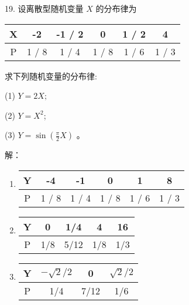 \documentclass[14pt]{scrartcl} %
\numberwithin{equation}{section} %
\numberwithin{figure}{section} %
\numberwithin{table}{section} %
\begin{document}
	19. 设离散型随机变量 $X$ 的分布律为
	
	\begin{tabular}{c|ccccc}
		X & -2 & -1 / 2 & 0 & 1 / 2 & 4\\
		\hline
		P & 1 / 8 & 1 / 4 & 1 / 8 & 1 / 6 & 1 / 3 \\
	\end{tabular}
	求下列随机变量的分布律: 
	
	(1) $Y=2 X ;$
	
	(2) $Y=X^{2}$; 
	
	(3) $Y=\sin \left(\frac{\pi}{2} X\right)$ 。
	
	\vspace*{1cm}
	解：
	\begin{enumerate}[(1)]
		\item 
		\begin{tabular}{c|ccccc}
			Y & -4 & -1& 0 & 1 & 8\\
			\hline
			P & 1 / 8 & 1 / 4 & 1 / 8 & 1 / 6 & 1 / 3 \\
		\end{tabular}
		\item 
		\begin{tabular}{c|cccc}
			Y & 0 & 1/4 & 4 & 16 \\
			\hline
			P & 1/8 & 5/12 & 1/8 & 1/3 \\
		\end{tabular}
		\item 
		\begin{tabular}{c|ccc}
			Y & $-\sqrt{2}/2$ & 0 & $\sqrt{2}/2$ \\
			\hline
			P & 1/4 & 7/12 & 1/6 \\
		\end{tabular}
	\end{enumerate}
	
	
\end{document}
